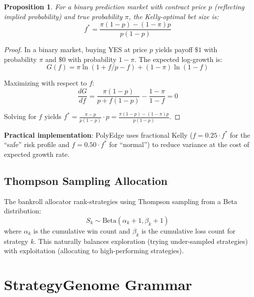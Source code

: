 \documentclass[11pt]{article}
\newtheorem{proposition}{Proposition}
\begin{document}
\begin{proposition}
For a binary prediction market with contract price $p$ (reflecting implied probability) and true probability $\pi$, the Kelly-optimal bet size is:
\begin{equation}
f^* = \frac{\pi(1-p) - (1-\pi)p}{p(1-p)}
\end{equation}
\end{proposition}

\begin{proof}
In a binary market, buying YES at price $p$ yields payoff $\$1$ with probability $\pi$ and $\$0$ with probability $1-\pi$. The expected log-growth is:
\begin{equation}
G(f) = \pi \ln(1 + f/p - f) + (1-\pi)\ln(1 - f)
\end{equation}

Maximizing with respect to $f$:
\begin{equation}
\frac{dG}{df} = \frac{\pi(1-p)}{p + f(1-p)} - \frac{1-\pi}{1-f} = 0
\end{equation}

Solving for $f$ yields $f^* = \frac{\pi - p}{p(1-p)} \cdot p = \frac{\pi(1-p) - (1-\pi)p}{p(1-p)}$.
\end{proof}

\textbf{Practical implementation}: PolyEdge uses fractional Kelly ($f = 0.25 \cdot f^*$ for the ``safe'' risk profile and $f = 0.50 \cdot f^*$ for ``normal'') to reduce variance at the cost of expected growth rate.

\subsection{Thompson Sampling Allocation}

The bankroll allocator rank-strategies using Thompson sampling from a Beta distribution:
\begin{equation}
S_k \sim \text{Beta}(\alpha_k + 1, \beta_k + 1)
\end{equation}
where $\alpha_k$ is the cumulative win count and $\beta_k$ is the cumulative loss count for strategy $k$. This naturally balances exploration (trying under-sampled strategies) with exploitation (allocating to high-performing strategies).


\section{StrategyGenome Grammar}
\label{sec:grammar}
\end{document}
